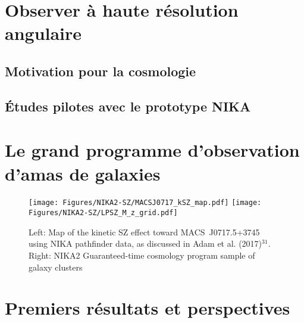 %
%

{\color{vert}\lipsum[4]}

\section{Observer à haute résolution angulaire}

\subsection{Motivation pour la cosmologie}
{\color{vert}\lipsum[2-4]}
\subsection{\'Etudes pilotes avec le prototype NIKA}
{\color{vert}\lipsum[5-7]}

\section{Le grand programme d'observation d'amas de galaxies}

{\color{vert}\lipsum[2-5]}

\begin{figure}
  \centering
  \texttt{[image: Figures/NIKA2-SZ/MACSJ0717\_kSZ\_map.pdf]}
  \hspace{4mm}
  \texttt{[image: Figures/NIKA2-SZ/LPSZ\_M\_z\_grid.pdf]}
  \caption{Left: Map of the kinetic SZ effect toward \mbox{MACS~J0717.5+3745} using NIKA pathfinder data, as discussed in Adam et al. (2017)$^{31}$. Right: NIKA2 Guaranteed-time cosmology program sample of galaxy clusters}
  \label{fig:nikanika2}
\end{figure}

\section{Premiers résultats et perspectives}


